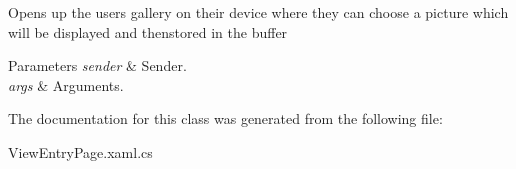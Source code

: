Opens up the users gallery on their device where they can choose a picture which will be displayed and thenstored in the buffer 


\begin{DoxyParams}{Parameters}
{\em sender} & Sender.\\
\hline
{\em args} & Arguments.\\
\hline
\end{DoxyParams}


The documentation for this class was generated from the following file\+:\begin{DoxyCompactItemize}
\item 
View\+Entry\+Page.\+xaml.\+cs\end{DoxyCompactItemize}
